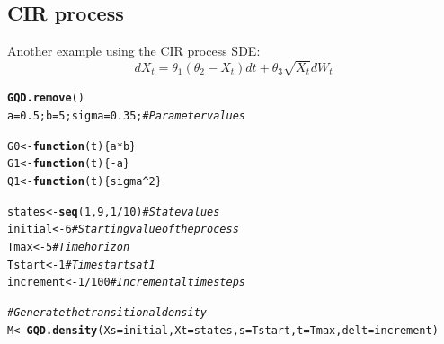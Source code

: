 \documentclass[a4paper,11pt]{article}\usepackage[]{graphicx}\usepackage[]{color}
\makeatletter
\newcommand{\hlnum}[1]{\textcolor[rgb]{0.686,0.059,0.569}{#1}}%
\newcommand{\hlcom}[1]{\textcolor[rgb]{0.678,0.584,0.686}{\textit{#1}}}%
\newcommand{\hlopt}[1]{\textcolor[rgb]{0,0,0}{#1}}%
\newcommand{\hlstd}[1]{\textcolor[rgb]{0.345,0.345,0.345}{#1}}%
\newcommand{\hlkwa}[1]{\textcolor[rgb]{0.161,0.373,0.58}{\textbf{#1}}}%
\newcommand{\hlkwb}[1]{\textcolor[rgb]{0.69,0.353,0.396}{#1}}%
\newcommand{\hlkwc}[1]{\textcolor[rgb]{0.333,0.667,0.333}{#1}}%
\newcommand{\hlkwd}[1]{\textcolor[rgb]{0.737,0.353,0.396}{\textbf{#1}}}%
\newenvironment{kframe}{%
 \def\at@end@of@kframe{}%
 \ifinner\ifhmode%
  \def\at@end@of@kframe{\end{minipage}}%
  \begin{minipage}{\columnwidth}%
 \fi\fi%
 \def\FrameCommand##1{\hskip\@totalleftmargin \hskip-\fboxsep
 \colorbox{shadecolor}{##1}\hskip-\fboxsep
     \hskip-\linewidth \hskip-\@totalleftmargin \hskip\columnwidth}%
 \MakeFramed {\advance\hsize-\width
   \@totalleftmargin\z@ \linewidth\hsize
   \@setminipage}}%
 {\par\unskip\endMakeFramed%
 \at@end@of@kframe}
\newenvironment{knitrout}{}{} %
\makeatother
\begin{document}
\subsection{CIR process}
Another example using the CIR process SDE:
\begin{equation}
dX_t = \theta_1 (\theta_2 - X_t)dt + \theta_3 \sqrt{X_t} dW_t
\end{equation}

\begin{knitrout}
\color{fgcolor}\begin{kframe}
\begin{alltt}
\hlkwd{GQD.remove}\hlstd{()}
\hlstd{a} \hlkwb{=} \hlnum{0.5}\hlstd{; b} \hlkwb{=} \hlnum{5}\hlstd{; sigma} \hlkwb{=} \hlnum{0.35}\hlstd{;} \hlcom{# Parameter values}

\hlstd{G0} \hlkwb{<-} \hlkwa{function}\hlstd{(}\hlkwc{t}\hlstd{)\{a}\hlopt{*}\hlstd{b\}}
\hlstd{G1} \hlkwb{<-} \hlkwa{function}\hlstd{(}\hlkwc{t}\hlstd{)\{}\hlopt{-}\hlstd{a\}}
\hlstd{Q1} \hlkwb{<-} \hlkwa{function}\hlstd{(}\hlkwc{t}\hlstd{)\{sigma}\hlopt{^}\hlnum{2}\hlstd{\}}

\hlstd{states}     \hlkwb{<-}  \hlkwd{seq}\hlstd{(}\hlnum{1}\hlstd{,} \hlnum{9}\hlstd{,} \hlnum{1}\hlopt{/}\hlnum{10}\hlstd{)}\hlcom{# State values}
\hlstd{initial}    \hlkwb{<-}  \hlnum{6}              \hlcom{# Starting value of the process}
\hlstd{Tmax}       \hlkwb{<-}  \hlnum{5}              \hlcom{# Time horizon}
\hlstd{Tstart}     \hlkwb{<-}  \hlnum{1}              \hlcom{# Time starts at 1}
\hlstd{increment}  \hlkwb{<-}  \hlnum{1}\hlopt{/}\hlnum{100}          \hlcom{# Incremental time steps}

\hlcom{# Generate the transitional density}
\hlstd{M} \hlkwb{<-} \hlkwd{GQD.density}\hlstd{(}\hlkwc{Xs} \hlstd{= initial,} \hlkwc{Xt} \hlstd{= states,} \hlkwc{s} \hlstd{= Tstart,} \hlkwc{t} \hlstd{= Tmax,} \hlkwc{delt} \hlstd{= increment)}


\end{alltt}
\end{kframe}
\end{knitrout}
\end{document}
